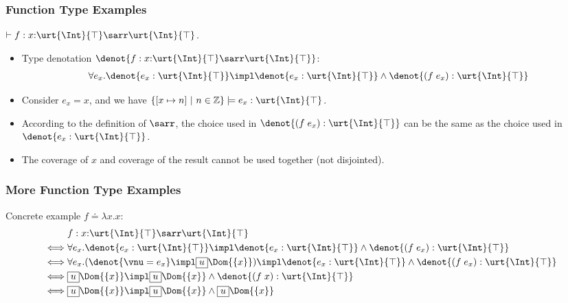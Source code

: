 

\begin{frame}[fragile]
    \frametitle{Function Type Examples}

\begin{example} $\vdash f : x{:}\urt{\Int}{\top} \sarr \urt{\Int}{\top}$.
\begin{itemize}
    \item Type denotation $\denot{f: x{:}\urt{\Int}{\top} \sarr \urt{\Int}{\top}}$:
    \begin{align*}
        \forall e_x. \denot{e_x : \urt{\Int}{\top}} \impl \denot{e_x : \urt{\Int}{\top}} \land \denot{(f\;e_x) : \urt{\Int}{\top}}
    \end{align*}
    \item Consider $e_x = x$, and we have $\{[x\mapsto n] ~|~ n \in \mathbb{Z} \} \models e_x : \urt{\Int}{\top}$. 
    \item According to the definition of $\sarr$, the choice used in $\denot{(f\;e_x) : \urt{\Int}{\top}}$ can be the same as the choice used in $\denot{e_x : \urt{\Int}{\top}}$.
    \item The coverage of $x$ and coverage of the result cannot be used together (not disjointed).
\end{itemize}
\end{example}

\end{frame}

\begin{frame}[fragile]
    \frametitle{More Function Type Examples}

\begin{example}[Situation 2] Concrete example $f \doteq \lambda x. x$:
    \begin{align*}
        &f : x{:}\urt{\Int}{\top} \sarr \urt{\Int}{\top}
    \\ \iff &\forall e_x. \denot{e_x : \urt{\Int}{\top}} \impl \denot{e_x : \urt{\Int}{\top}} \land \denot{(f\;e_x) : \urt{\Int}{\top}}
    \\ \iff &\forall e_x. (\denot{\vnu = e_x} \impl \supExt \Dom{\{x\}}) \impl \denot{e_x : \urt{\Int}{\top}} \land \denot{(f\;e_x) : \urt{\Int}{\top}}
    \\ \iff &\supExt \Dom{\{x\}} \impl \supExt \Dom{\{x\}} \land \denot{(f\;x) : \urt{\Int}{\top}}
    \\ \iff &\supExt \Dom{\{x\}} \impl \supExt \Dom{\{x\}} \land \supExt \Dom{\{x\}}
    \end{align*} 
\end{example}

\end{frame}

